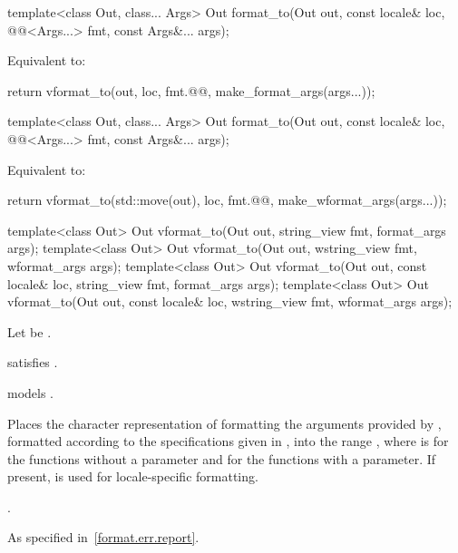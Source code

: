 %
\begin{itemdecl}
template<class Out, class... Args>
  Out format_to(Out out, const locale& loc, @@<Args...>  fmt, const Args&... args);
\end{itemdecl}

\begin{itemdescr}
\pnum
\effects
Equivalent to:
\begin{codeblock}
return vformat_to(out, loc, fmt.@@, make_format_args(args...));
\end{codeblock}
\end{itemdescr}

%
\begin{itemdecl}
template<class Out, class... Args>
  Out format_to(Out out, const locale& loc, @@<Args...> fmt, const Args&... args);
\end{itemdecl}

\begin{itemdescr}
\pnum
\effects
Equivalent to:
\begin{codeblock}
return vformat_to(std::move(out), loc, fmt.@@, make_wformat_args(args...));
\end{codeblock}
\end{itemdescr}

%
\begin{itemdecl}
template<class Out>
  Out vformat_to(Out out, string_view fmt, format_args args);
template<class Out>
  Out vformat_to(Out out, wstring_view fmt, wformat_args args);
template<class Out>
  Out vformat_to(Out out, const locale& loc, string_view fmt, format_args args);
template<class Out>
  Out vformat_to(Out out, const locale& loc, wstring_view fmt, wformat_args args);
\end{itemdecl}

\begin{itemdescr}
\pnum
Let  be .

\pnum
\constraints
{} satisfies .

\pnum
\expects
{} models .

\pnum
\effects
Places the character representation of formatting
the arguments provided by ,
formatted according to the specifications given in ,
into the range ,
where  is
 for the functions without a  parameter and
 for the functions with a  parameter.
If present,  is used for locale-specific formatting.

\pnum
\returns
{}.

\pnum
\throws
As specified in~\ref{format.err.report}.
\end{itemdescr}

